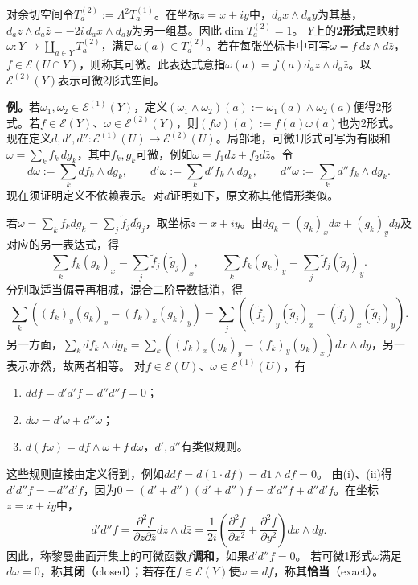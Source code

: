 对余切空间令$T_a^{(2)}:=\Lambda^2T_a^{(1)}$。在坐标$z=x+iy$中，$d_ax\wedge d_ay$为其基，$d_az\wedge d_a\bar z=-2i\,d_ax\wedge d_ay$为另一组基。因此$\dim T_a^{(2)}=1$。
$Y$上的\textbf{2形式}是映射$\omega:Y\to\coprod_{a\in Y}T_a^{(2)}$，满足$\omega(a)\in T_a^{(2)}$。若在每张坐标卡中可写$\omega=f\,dz\wedge d\bar z$，$f\in\mathcal E(U\cap Y)$，则称其可微。此表达式意指$\omega(a)=f(a)d_az\wedge d_a\bar z$。以$\mathcal E^{(2)}(Y)$表示可微2形式空间。

\textbf{例。}若$\omega_1,\omega_2\in\mathcal E^{(1)}(Y)$，定义$(\omega_1\wedge\omega_2)(a):=\omega_1(a)\wedge\omega_2(a)$便得2形式。若$f\in\mathcal E(Y)$、$\omega\in\mathcal E^{(2)}(Y)$，则$(f\omega)(a):=f(a)\omega(a)$也为2形式。
现在定义$d,d',d'':\mathcal E^{(1)}(U)\to\mathcal E^{(2)}(U)$。局部地，可微1形式可写为有限和$\omega=\sum_k f_k\,dg_k$，其中$f_k,g_k$可微，例如$\omega=f_1dz+f_2d\bar z$。令
\[
d\omega:=\sum_k df_k\wedge dg_k,\qquad d'\omega:=\sum_k d'f_k\wedge dg_k,\qquad d''\omega:=\sum_k d''f_k\wedge dg_k.
\]
现在须证明定义不依赖表示。对$d$证明如下，原文称其他情形类似。

若$\omega=\sum_k f_kdg_k=\sum_j\widetilde f_jd\widetilde g_j$，取坐标$z=x+iy$。由$dg_k=(g_k)_x dx+(g_k)_y dy$及对应的另一表达式，得
\[
\sum_k f_k(g_k)_x=\sum_j\widetilde f_j(\widetilde g_j)_x,\qquad
\sum_k f_k(g_k)_y=\sum_j\widetilde f_j(\widetilde g_j)_y.
\]
分别取适当偏导再相减，混合二阶导数抵消，得
\[
\sum_k((f_k)_y(g_k)_x-(f_k)_x(g_k)_y)
=\sum_j((\widetilde f_j)_y(\widetilde g_j)_x-(\widetilde f_j)_x(\widetilde g_j)_y).
\]
另一方面，$\sum_kdf_k\wedge dg_k=\sum_k((f_k)_x(g_k)_y-(f_k)_y(g_k)_x)dx\wedge dy$，另一表示亦然，故两者相等。
对$f\in\mathcal E(U)$、$\omega\in\mathcal E^{(1)}(U)$，有
\begin{enumerate}[label=(\roman*)]
\item $ddf=d'd'f=d''d''f=0$；
\item $d\omega=d'\omega+d''\omega$；
\item $d(f\omega)=df\wedge\omega+f\,d\omega$，$d',d''$有类似规则。
\end{enumerate}
这些规则直接由定义得到，例如$ddf=d(1\cdot df)=d1\wedge df=0$。
由(i)、(ii)得$d'd''f=-d''d'f$，因为$0=(d'+d'')(d'+d'')f=d'd''f+d''d'f$。在坐标$z=x+iy$中，
\[
d'd''f=\frac{\partial^2 f}{\partial z\partial\bar z}dz\wedge d\bar z
=\frac1{2i}\left(\frac{\partial^2f}{\partial x^2}+\frac{\partial^2f}{\partial y^2}\right)dx\wedge dy.
\]
因此，称黎曼曲面开集上的可微函数$f$\textbf{调和}，如果$d'd''f=0$。
若可微1形式$\omega$满足$d\omega=0$，称其\textbf{闭}（closed）；若存在$f\in\mathcal E(Y)$使$\omega=df$，称其\textbf{恰当}（exact）。

